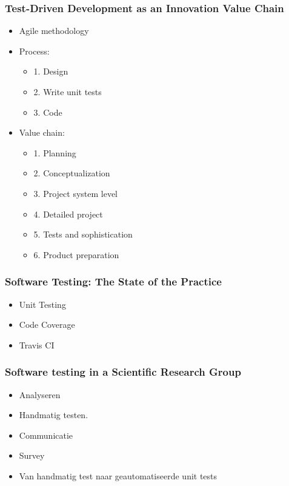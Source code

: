 \documentclass[10pt]{beamer}
\begin{document}
	\begin{frame}
		\frametitle{Test-Driven Development as an Innovation Value Chain}
		\begin{itemize}
			\item Agile methodology
			\item Process:
				\begin{itemize}
					\item 1. Design
					\item 2. Write unit tests
					\item 3. Code
				\end{itemize}
			\item Value chain:
				\begin{itemize}
					\item 1. Planning
					\item 2. Conceptualization
					\item 3. Project system level
					\item 4. Detailed project
					\item 5. Tests and sophistication
					\item 6. Product preparation
				\end{itemize}
		\end{itemize}
	\end{frame}

	\begin{frame}
		\frametitle{Software Testing: The State of the Practice}
		\begin{itemize}
			\item Unit Testing
			\item Code Coverage
			\item Travis CI
		\end{itemize}
	\end{frame}	

	\begin{frame}
		\frametitle{Software testing in a Scientific Research Group}
		\begin{itemize}
			\item Analyseren 
			\item Handmatig testen.
			\item Communicatie
			\item Survey
			\item Van handmatig test naar geautomatiseerde unit tests
		\end{itemize} 
	\end{frame}
\end{document}
